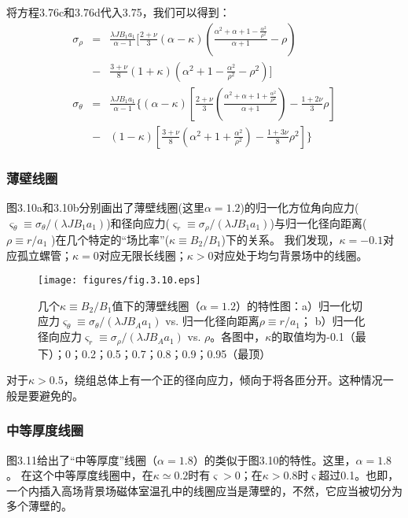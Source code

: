 将方程3.76c和3.76d代入3.75，我们可以得到：
\begin{eqnarray}
\sigma_\rho&=&\frac{\lambda JB_1a_1}{\alpha-1}[\frac{2+\nu}{3}(\alpha-\kappa)(\frac{\alpha^2+\alpha+1-\frac{\alpha^2}{\rho^2}}{\alpha+1}-\rho) \\ \nonumber
&-&\frac{3+\nu}{8}(1+\kappa)(\alpha^2+1-\frac{\alpha^2}{\rho^2}-\rho^2)]\\
\sigma_\theta&=&\frac{\lambda JB_1a_1}{\alpha-1}\{(\alpha-\kappa)[\frac{2+\nu}{3}(\frac{\alpha^2+\alpha+1+{\frac{\alpha^2}{\rho^2}}}{\alpha+1})-\frac{1+2\nu}{3}\rho] \\ \nonumber
&-&(1-\kappa)[\frac{3+\nu}{8}(\alpha^2+1+\frac{\alpha^2}{\rho^2})-\frac{1+3\nu}{8}\rho^2]\}
\end{eqnarray}

\subsubsection{薄壁线圈}
图3.10a和3.10b分别画出了薄壁线圈(这里$\alpha=1.2$)的归一化方位角向应力($\varsigma_\theta\equiv \sigma_{\theta}/(\lambda J B_1 a_1)$)和径向应力($\varsigma_r\equiv \sigma_{\rho}/(\lambda J B_1 a_1)$)与归一化径向距离($\rho\equiv r/a_1$ )在几个特定的“场比率”($\kappa\equiv B_2/B_1$)下的关系。
我们发现，$\kappa=-0.1$对应孤立螺管；$\kappa=0$对应无限长线圈；$\kappa>0$对应处于均匀背景场中的线圈。
\begin{figure}
  \centering
 \texttt{[image: figures/fig.3.10.eps]}
  \caption{几个$\kappa\equiv B_2/B_1$值下的薄壁线圈（$\alpha=1.2$）的特性图：a）归一化切应力$\varsigma_\theta\equiv \sigma_\theta/(\lambda J B_A a_1)$ vs. 归一化径向距离$\rho\equiv r/a_1$；
  b）归一化径向应力$\varsigma_r \equiv \sigma_\rho/(\lambda J B_A a_1)$ vs. $\rho$。各图中，$\kappa$的取值均为-0.1（最下）；0；0.2；0.5；0.7；0.8；0.9；0.95（最顶） }
\end{figure}

对于$\kappa>0.5$，绕组总体上有一个正的径向应力，倾向于将各匝分开。这种情况一般是要避免的。

\subsubsection{中等厚度线圈}
图3.11给出了“中等厚度”线圈（$\alpha=1.8$）的类似于图3.10的特性。这里，$\alpha=1.8$。
在这个中等厚度线圈中，在$\kappa\simeq 0.2$时有$\varsigma>0$；在$\kappa> 0.8$时$\varsigma$超过0.1。也即，一个内插入高场背景场磁体室温孔中的线圈应当是薄壁的，不然，它应当被切分为多个薄壁的。

